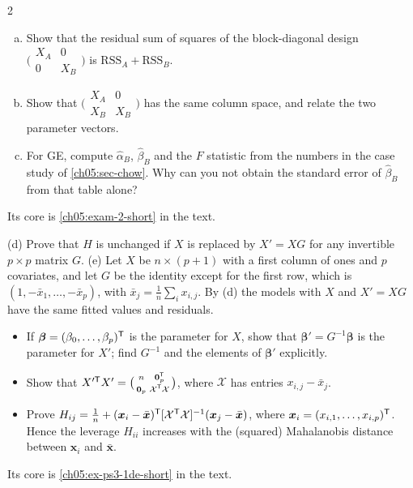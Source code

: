 \begin{paracol}{2}
\begin{exercise}\label{ch05:exam-2}
\leavevmode
\begin{enumerate}[(a)]
  \item Show that the residual sum of squares of the block-diagonal design $\bigl(\begin{smallmatrix}X_A&0\\0&X_B\end{smallmatrix}\bigr)$ is
      $\text{RSS}_A+\text{RSS}_B$.
  \item Show that $\bigl(\begin{smallmatrix}X_A&0\\X_B&X_B\end{smallmatrix}\bigr)$ has the same column space, and relate the two
      parameter vectors.
  \item For GE, compute $\hat\alpha_B$, $\hat\beta_B$ and the $F$ statistic from the numbers in the case study of
      \cref{ch05:sec-chow}. Why can you not obtain the standard error of $\hat\beta_B$ from that table alone?
\end{enumerate}
Its core is \cref{ch05:exam-2-short} in the text.
\end{exercise}

\begin{exercise}\label{ch05:ex-ps3-1de}
(d) Prove that $H$ is unchanged if $X$ is replaced by $X'=XG$ for any invertible $p\times p$ matrix $G$.
(e) Let $X$ be $n\times(p+1)$ with a first column of ones and $p$ covariates, and let $G$ be the identity except for the first
row, which is $(1,-\bar x_1,\dots,-\bar x_p)$, with $\bar x_j=\frac1n\sum_ix_{i,j}$. By (d) the models with $X$ and $X'=XG$ have the
same fitted values and residuals.
\begin{itemize}
  \item If $\bm\beta=(\beta_0,\dots,\beta_p)^{\mathsf T}$ is the parameter for $X$, show that $\bm\beta'=G^{-1}\bm\beta$ is the parameter for $X'$; find
        $G^{-1}$ and the elements of $\bm\beta'$ explicitly.
  \item Show that $X'^{\mathsf T}X'=\bigl(\begin{smallmatrix}n&\bm 0_p^{\mathsf T}\\ \bm 0_p&\mathcal X^{\mathsf T}\mathcal X\end{smallmatrix}\bigr)$, where $\mathcal X$ has entries $x_{i,j}-\bar x_j$.
  \item Prove $H_{ij}=\frac1n+(\bm x_i-\bar{\bm x})^{\mathsf T}[\mathcal X^{\mathsf T}\mathcal X]^{-1}(\bm x_j-\bar{\bm x})$, where $\bm x_i=(x_{i,1},\dots,x_{i,p})^{\mathsf T}$. Hence the
        leverage $H_{ii}$ increases with the (squared) Mahalanobis distance between $\bm x_i$ and $\bar{\bm x}$.
\end{itemize}
Its core is \cref{ch05:ex-ps3-1de-short} in the text.
\end{exercise}


\end{paracol}
